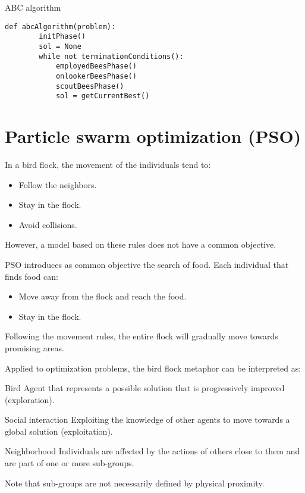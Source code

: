 \begin{algorithm}
\caption{ABC algorithm}
\begin{lstlisting}[mathescape=true]
    def abcAlgorithm(problem):
        initPhase()
        sol = None
        while not terminationConditions():
            employedBeesPhase()
            onlookerBeesPhase()
            scoutBeesPhase()
            sol = getCurrentBest()
\end{lstlisting}
\end{algorithm}



\section{Particle swarm optimization (PSO)}

In a bird flock, the movement of the individuals tend to:
\begin{itemize}
    \item Follow the neighbors.
    \item Stay in the flock.
    \item Avoid collisions.
\end{itemize}
However, a model based on these rules does not have a common objective.

PSO introduces as common objective the search of food.
Each individual that finds food can:
\begin{itemize}
    \item Move away from the flock and reach the food.
    \item Stay in the flock.
\end{itemize}
Following the movement rules, the entire flock will gradually move towards promising areas.

Applied to optimization problems, the bird flock metaphor can be interpreted as:
\begin{descriptionlist}
    \item[Bird] 
        Agent that represents a possible solution that is progressively improved (exploration).

    \item[Social interaction] 
        Exploiting the knowledge of other agents to move towards a global solution (exploitation).

    \item[Neighborhood]
        Individuals are affected by the actions of others close to them and are part of one or more sub-groups.

        Note that sub-groups are not necessarily defined by physical proximity.
\end{descriptionlist}


